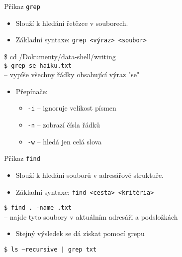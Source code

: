\documentclass{beamer}
\newcommand{\ts}{\raisebox{-0.25em}{\textasciitilde}}
\begin{document}
\begin{frame}[fragile]{Příkaz \texttt{grep}}
	\begin{itemize}
		\item Slouží k hledání řetězce v souborech.
		\item Základní syntaxe: \texttt{grep <výraz> <soubor>}
	\end{itemize}
	\hspace{2em}\$ cd \texttt{\ts}/Dokumenty/data-shell/writing \\
	\hspace{2em}\texttt{\$ grep se haiku.txt} \\
	\hspace{2em}– vypíše všechny řádky obsahující výraz "se"
	\vspace{0.5em}
	\begin{itemize}
		\item Přepínače:
		\begin{itemize}
			\item \texttt{-i} – ignoruje velikost písmen
			\item \texttt{-n} – zobrazí čísla řádků
			\item \texttt{-w} – hledá jen celá slova
		\end{itemize}
	\end{itemize}
\end{frame}

\begin{frame}[fragile]{Příkaz \texttt{find}}
	\begin{itemize}
		\item Slouží k hledání souborů v adresářové struktuře.
		\item Základní syntaxe: \texttt{find <cesta> <kritéria>}
	\end{itemize}
	
	\hspace{2em}\texttt{\$ find . -name \textquotesingle *.txt\textquotesingle} \\
	\hspace{2em}– najde tyto soubory v aktuálním adresáři a podsložkách
	\vspace{0.5em}
	\begin{itemize}
	\item Stejný výsledek se dá získat pomocí grepu
	\end{itemize}
	\hspace{2em}\texttt{\$ ls --recursive | grep txt} \\
\end{frame}
\end{document}
